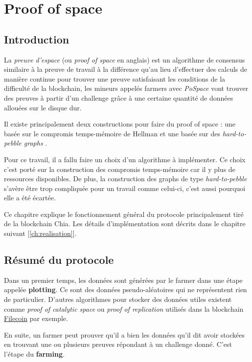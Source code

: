 \documentclass[../tb_report.tex]{subfiles}
\begin{document}
\chapter{Proof of space}
\label{ch:pospace}

\section{Introduction}

La \emph{preuve d'espace} (ou \emph{proof of space} en anglais) est un algorithme de consensus similaire à la preuve de travail à la différence qu'au lieu d'effectuer des calculs de manière continue pour trouver une preuve satisfaisant les conditions de la difficulté de la blockchain, les mineurs appelés farmers avec \emph{PoSpace} vont trouver des preuves à partir d'un challenge grâce à une certaine quantité de données allouées sur le disque dur. 

Il existe principalement deux constructions pour faire du proof of space : une basée sur le compromis temps-mémoire de Hellman \cite{DBLP:conf/asiacrypt/AbusalahACKPR17} et une basée sur des \emph{hard-to-pebble graphs} \cite{DBLP:conf/crypto/DziembowskiFKP15}.

Pour ce travail, il a fallu faire un choix d'un algorithme à implémenter. Ce choix c'est porté sur la construction des compromis temps-mémoire car il y plus de ressources disponibles. De plus, la construction des graphs de type \emph{hard-to-pebble} s'avère être trop compliquée pour un travail comme celui-ci, c'est aussi pourquoi elle a été écartée.

Ce chapitre explique le fonctionnement général du protocole principalement tiré de la blockchain Chia. Les détails d'implémentation sont décrits dans le chapitre suivant [\ref{ch:realisation}].

\section{Résumé du protocole}

Dans un premier temps, les données sont générées par le farmer dans une étape appelée \textbf{plotting}. Ce sont des données pseudo-aléatoires qui ne représentent rien de particulier. D'autres algorithmes pour stocker des données utiles existent comme \emph{proof of catalytic space} ou \emph{proof of replication} utilisés dans la blockchain \href{https://filecoin.io/}{Filecoin} par exemple.

En suite, un farmer peut prouver qu'il a bien les données qu'il dit avoir stockées en trouvant une ou plusieurs preuves répondant à un challenge donné. C'est l'étape du \textbf{farming}.
\end{document}
